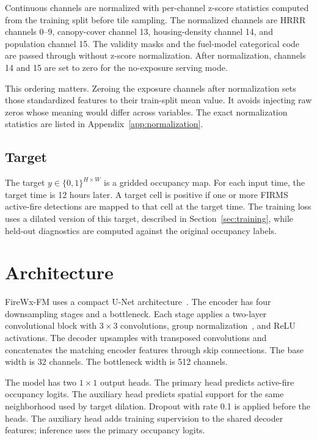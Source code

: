 \documentclass[11pt]{article}
\newcommand{\model}{FireWx-FM}
\begin{document}
Continuous channels are normalized with per-channel z-score statistics computed from the training split before tile sampling.
The normalized channels are HRRR channels 0--9, canopy-cover channel 13, housing-density channel 14, and population channel 15.
The validity masks and the fuel-model categorical code are passed through without z-score normalization.
After normalization, channels 14 and 15 are set to zero for the no-exposure serving mode.

This ordering matters.
Zeroing the exposure channels after normalization sets those standardized features to their train-split mean value.
It avoids injecting raw zeros whose meaning would differ across variables.
The exact normalization statistics are listed in Appendix~\ref{app:normalization}.

\subsection{Target}

The target \(y \in \{0,1\}^{H\times W}\) is a gridded occupancy map.
For each input time, the target time is 12 hours later.
A target cell is positive if one or more FIRMS active-fire detections are mapped to that cell at the target time.
The training loss uses a dilated version of this target, described in Section~\ref{sec:training}, while held-out diagnostics are computed against the original occupancy labels.

\section{Architecture}
\label{sec:architecture}

\model{} uses a compact U-Net architecture~\cite{ronneberger2015unet}.
The encoder has four downsampling stages and a bottleneck.
Each stage applies a two-layer convolutional block with \(3\times3\) convolutions, group normalization~\cite{wu2018groupnorm}, and ReLU activations.
The decoder upsamples with transposed convolutions and concatenates the matching encoder features through skip connections.
The base width is 32 channels.
The bottleneck width is 512 channels.

The model has two \(1\times1\) output heads.
The primary head predicts active-fire occupancy logits.
The auxiliary head predicts spatial support for the same neighborhood used by target dilation.
Dropout with rate 0.1 is applied before the heads.
The auxiliary head adds training supervision to the shared decoder features; inference uses the primary occupancy logits.
\end{document}
